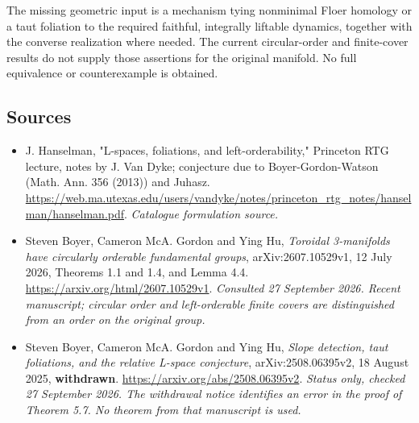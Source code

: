 \documentclass[11pt,a4paper]{article}
\numberwithin{equation}{section}
\begin{document}
The missing geometric input is a mechanism tying nonminimal Floer homology
or a taut foliation to the required faithful, integrally liftable dynamics,
together with the converse realization where needed. The current
circular-order and finite-cover results do not supply those assertions for
the original manifold. No full equivalence or counterexample is obtained.
\subsection{Sources}
\begin{itemize}\raggedright
\item[\textnormal{[S1]}]\hypertarget{source:statement:1}{} J. Hanselman, "L-spaces, foliations, and left-orderability," Princeton RTG lecture, notes by J. Van Dyke; conjecture due to Boyer-Gordon-Watson (Math. Ann. 356 (2013)) and Juhasz.
\url{https://web.ma.utexas.edu/users/vandyke/notes/princeton_rtg_notes/hanselman/hanselman.pdf}.
{\small\textit{Catalogue formulation source.}}
\item[\textnormal{[E1]}]\hypertarget{extra:statement:1}{} Steven Boyer, Cameron
McA. Gordon and Ying Hu, \emph{Toroidal 3-manifolds have circularly orderable
fundamental groups}, arXiv:2607.10529v1, 12 July 2026, Theorems 1.1 and 1.4,
and Lemma 4.4. \url{https://arxiv.org/html/2607.10529v1}.
{\small\textit{Consulted 27 September 2026. Recent manuscript; circular
order and left-orderable finite covers are distinguished from an order
on the original group.}}
\item[\textnormal{[E2]}]\hypertarget{extra:statement:2}{} Steven Boyer, Cameron
McA. Gordon and Ying Hu, \emph{Slope detection, taut foliations, and the
relative L-space conjecture}, arXiv:2508.06395v2, 18 August 2025,
\textbf{withdrawn}. \url{https://arxiv.org/abs/2508.06395v2}.
{\small\textit{Status only, checked 27 September 2026. The withdrawal
notice identifies an error in the proof of Theorem 5.7. No theorem from
that manuscript is used.}}
\end{itemize}
\end{document}
